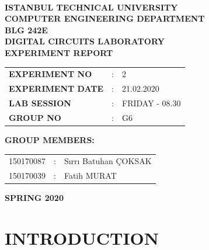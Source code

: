 \documentclass[pdftex,12pt,a4paper]{article}
\begin{document}
\begin{titlepage}
\begin{center}
\textbf{}\\
\textbf{\Large{ISTANBUL TECHNICAL UNIVERSITY}}\\
\vspace{0.5cm}
\textbf{\Large{COMPUTER ENGINEERING DEPARTMENT}}\\
\vspace{2cm}
\textbf{\Large{BLG 242E\\ DIGITAL CIRCUITS LABORATORY\\ EXPERIMENT REPORT}}\\
\vspace{2.8cm}
\begin{table}[ht]
\centering
\Large{
\begin{tabular}{lcl}
\textbf{EXPERIMENT NO}  & : & 2 \\
\textbf{EXPERIMENT DATE}  & : & 21.02.2020 \\
\textbf{LAB SESSION}  & : & FRIDAY - 08.30 \\
\textbf{GROUP NO}  & : & G6 \\
\end{tabular}}
\end{table}
\vspace{1cm}
\textbf{\Large{GROUP MEMBERS:}}\\
\begin{table}[ht]
\centering
\Large{
\begin{tabular}{rcl}
150170087  & : & Sırrı Batuhan ÇOKSAK \\
150170039  & : & Fatih MURAT \\
\end{tabular}}
\end{table}
\vspace{2.8cm}
\textbf{\Large{SPRING 2020}}

\end{center}
\end{titlepage}

\thispagestyle{empty}
\setcounter{tocdepth}{4}
\tableofcontents
\clearpage

\setcounter{page}{1}

\section{INTRODUCTION}
\end{document}
